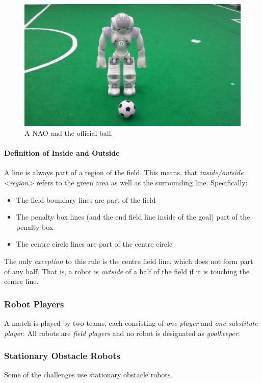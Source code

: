\begin{figure}[t]
	\centerline{\includegraphics[height=0.28\columnwidth]{figs/robotWithBall2016.jpg}}
	\caption{A NAO and the official ball.}
	\label{fig:ball}
\end{figure}


\paragraph{Definition of Inside and Outside}
\label{sec:inside_outside}

A line is always part of a region of the field.
This means, that \emph{inside/outside \textless region\textgreater} refers to the green area as well as the surrounding line.
Specifically:
\begin{itemize}
	\item The field boundary lines are part of the field
	\item The penalty box lines (and the end field line inside of the goal) part of the penalty box
	\item The centre circle lines are part of the centre circle
\end{itemize}

The only \textit{exception} to this rule is the centre field line, which does not form part of any half.
That is, a robot is \textit{outside} of a half of the field if it is touching the centre line.

\newpage


\subsubsection{Robot Players}
\label{sec:robot_players}
A match is played by two teams, each consisting of \emph{one player} and \emph{one substitute player}. All robots are \emph{field players} and no robot is designated as \emph{goalkeeper}.

\subsubsection{Stationary Obstacle Robots}
\label{sec:stationary_obstacle_robots}
Some of the challenges use stationary obstacle robots.

